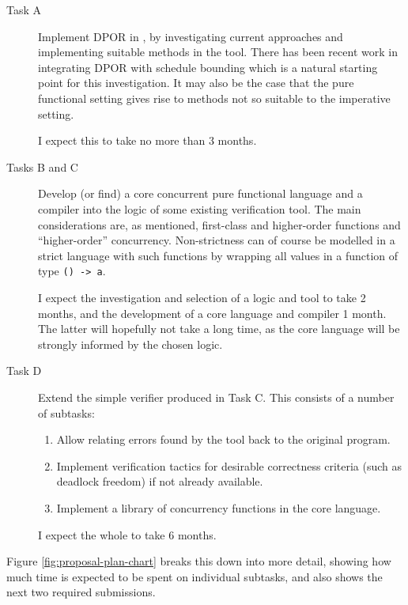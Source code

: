 \begin{description}
  \item[Task A] Implement DPOR in \dejafu{}, by investigating current
    approaches and implementing suitable methods in the tool. There
    has been recent work in integrating DPOR with schedule
    bounding\cite{bpor} which is a natural starting point for this
    investigation. It may also be the case that the pure functional
    setting gives rise to methods not so suitable to the imperative
    setting.

    I expect this to take no more than 3 months.

  \item[Tasks B and C] Develop (or find) a core concurrent pure
    functional language and a compiler into the logic of some existing
    verification tool. The main considerations are, as mentioned,
    first-class and higher-order functions and ``higher-order''
    concurrency. Non-strictness can of course be modelled in a strict
    language with such functions by wrapping all values in a function
    of type \verb|() -> a|.

    I expect the investigation and selection of a logic and tool
    to take 2 months, and the development of a core language and
    compiler 1 month. The latter will hopefully not take a long time,
    as the core language will be strongly informed by the chosen
    logic.

  \item[Task D] Extend the simple verifier produced in Task C. This
    consists of a number of subtasks:

    \begin{enumerate}
      \item Allow relating errors found by the tool back to the
        original program.
      \item Implement verification tactics for desirable correctness
        criteria (such as deadlock freedom) if not already available.
      \item Implement a library of concurrency functions in the core
        language.
    \end{enumerate}

    I expect the whole to take 6 months.
\end{description}

Figure \ref{fig:proposal-plan-chart} breaks this down into more
detail, showing how much time is expected to be spent on individual
subtasks, and also shows the next two required submissions.


